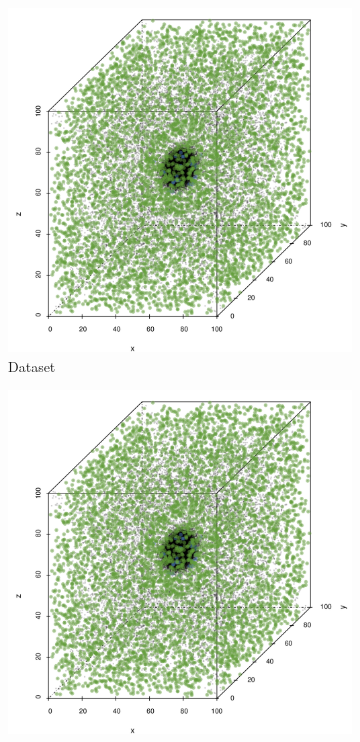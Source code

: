 	\begin{figure}
		\centering
		\begin{subfigure}{0.23\textwidth}
			\centering
			\includegraphics[keepaspectratio=true, width=\textwidth, height=0.23\textheight]{discussion/img/ferdosi_1_60000_anisotropy.png}
			\caption{Dataset \ferdosiOne}
			\label{fig:discussion:anisotropy:ferdosi1}
		\end{subfigure}
		\begin{subfigure}{0.23\textwidth}
			\centering
			\includegraphics[keepaspectratio=true, width=\textwidth, height=0.23\textheight]{discussion/img/ferdosi_1_60000_anisotropy.png}

\end{subfigure}
\end{figure}
